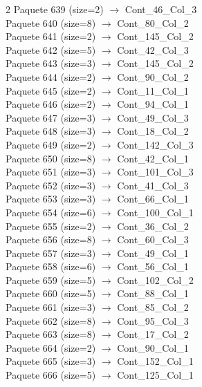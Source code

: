 \begin{multicols}{2}
Paquete 639 (size=2) $\rightarrow$ Cont\_46\_Col\_3\\
Paquete 640 (size=8) $\rightarrow$ Cont\_80\_Col\_2\\
Paquete 641 (size=2) $\rightarrow$ Cont\_145\_Col\_2\\
Paquete 642 (size=5) $\rightarrow$ Cont\_42\_Col\_3\\
Paquete 643 (size=3) $\rightarrow$ Cont\_145\_Col\_2\\
Paquete 644 (size=2) $\rightarrow$ Cont\_90\_Col\_2\\
Paquete 645 (size=2) $\rightarrow$ Cont\_11\_Col\_1\\
Paquete 646 (size=2) $\rightarrow$ Cont\_94\_Col\_1\\
Paquete 647 (size=3) $\rightarrow$ Cont\_49\_Col\_3\\
Paquete 648 (size=3) $\rightarrow$ Cont\_18\_Col\_2\\
Paquete 649 (size=2) $\rightarrow$ Cont\_142\_Col\_3\\
Paquete 650 (size=8) $\rightarrow$ Cont\_42\_Col\_1\\
Paquete 651 (size=3) $\rightarrow$ Cont\_101\_Col\_3\\
Paquete 652 (size=3) $\rightarrow$ Cont\_41\_Col\_3\\
Paquete 653 (size=3) $\rightarrow$ Cont\_66\_Col\_1\\
Paquete 654 (size=6) $\rightarrow$ Cont\_100\_Col\_1\\
Paquete 655 (size=2) $\rightarrow$ Cont\_36\_Col\_2\\
Paquete 656 (size=8) $\rightarrow$ Cont\_60\_Col\_3\\
Paquete 657 (size=3) $\rightarrow$ Cont\_49\_Col\_1\\
Paquete 658 (size=6) $\rightarrow$ Cont\_56\_Col\_1\\
Paquete 659 (size=5) $\rightarrow$ Cont\_102\_Col\_2\\
Paquete 660 (size=5) $\rightarrow$ Cont\_88\_Col\_1\\
Paquete 661 (size=3) $\rightarrow$ Cont\_85\_Col\_2\\
Paquete 662 (size=8) $\rightarrow$ Cont\_95\_Col\_3\\
Paquete 663 (size=8) $\rightarrow$ Cont\_17\_Col\_2\\
Paquete 664 (size=2) $\rightarrow$ Cont\_90\_Col\_1\\
Paquete 665 (size=3) $\rightarrow$ Cont\_152\_Col\_1\\
Paquete 666 (size=5) $\rightarrow$ Cont\_125\_Col\_1\\

\end{multicols}
